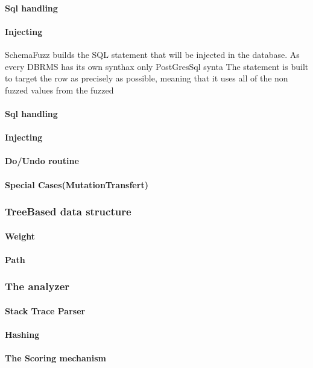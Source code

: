 \documentclass{article}
\begin{document}
				\paragraph{Sql handling}
				\paragraph{Injecting}
SchemaFuzz builds the SQL statement that will be injected in the database. As every DBRMS has its own synthax only PostGresSql synta
The statement is built to target the row as precisely as possible, meaning that it uses all of the non fuzzed values from the fuzzed

				\paragraph{Sql handling}
				\paragraph{Injecting}
				\paragraph{Do/Undo routine}
				\paragraph{Special Cases(MutationTransfert)}
			\subsubsection{TreeBased data structure}
				\paragraph{Weight}
				\paragraph{Path}
			\subsubsection{The analyzer}
				\paragraph{Stack Trace Parser}
				\paragraph{Hashing}
				\paragraph{The Scoring mechanism}
\end{document}
